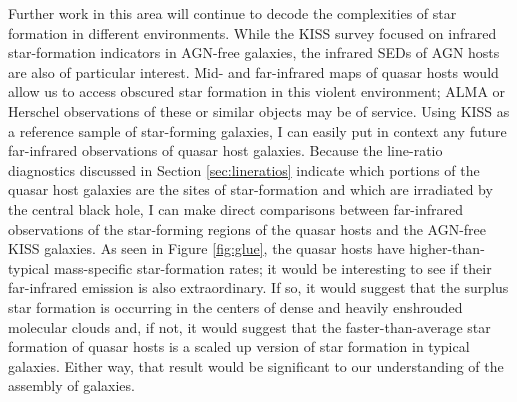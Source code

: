 Further work in this area will continue to decode the complexities of star formation in different environments.  While the KISS survey focused on infrared star-formation indicators in AGN-free galaxies, the infrared SEDs of AGN hosts are also of particular interest. Mid- and far-infrared maps of quasar hosts would allow us to access obscured star formation in this violent environment; ALMA or Herschel observations of these or similar objects may be of service.  Using KISS as a reference sample of star-forming galaxies, I can easily put in context any future far-infrared observations of quasar host galaxies. Because the line-ratio diagnostics discussed in Section \ref{sec:lineratios} indicate which portions of the quasar host galaxies are the sites of star-formation and which are irradiated by the central black hole, I can make direct comparisons between far-infrared observations of the star-forming regions of the quasar hosts and the AGN-free KISS galaxies.  As seen in Figure \ref{fig:glue}, the quasar hosts have higher-than-typical mass-specific star-formation rates; it would be interesting to see if their far-infrared emission is also extraordinary.  If so, it would suggest that the surplus star formation is occurring in the centers of dense and heavily enshrouded molecular clouds and, if not, it would suggest that the faster-than-average star formation of quasar hosts is a scaled up version of star formation in typical galaxies.  Either way, that result would be significant to our understanding of the assembly of galaxies.


